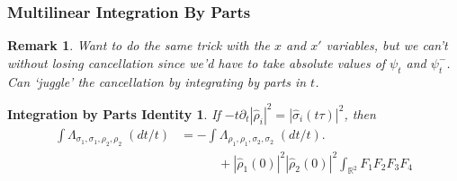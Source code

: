 \documentclass[usenames,dvipsnames,12pt]{beamer}
\DeclareMathOperator{\RR}{\mathbb{R}}
\newtheorem*{remark}{Remark}
\newtheorem*{expandoutsquares}{Expanding Out Squares}
\newtheorem*{ibpidentity}{Integration by Parts Identity}
\begin{document}


\begin{frame}
    \frametitle{Multilinear Integration By Parts}

    \begin{remark}
        Want to do the same trick with the $x$ and $x'$ variables, but we can't without losing cancellation since we'd have to take absolute values of $\psi_t$ and $\psi_t^-$. Can `juggle' the cancellation by integrating by parts in $t$.
    \end{remark}

    \pause

    \begin{ibpidentity}
        If $-t \partial_t | \widehat{\rho}_i |^2 = |\widehat{\sigma}_i(t \tau)|^2$, then
        \begin{align*}
            \int \Lambda_{\sigma_1, \sigma_1, \rho_2, \rho_2}\; (dt / t) &= - \int \Lambda_{\rho_1, \rho_1, \sigma_2, \sigma_2}\; (dt / t).\\
            &\quad\quad\quad + |\widehat{\rho}_1(0)|^2 |\widehat{\rho}_2(0)|^2 \int_{\RR^2} F_1 F_2 F_3 F_4
        \end{align*}
    \end{ibpidentity}
\end{frame}
\end{document}
